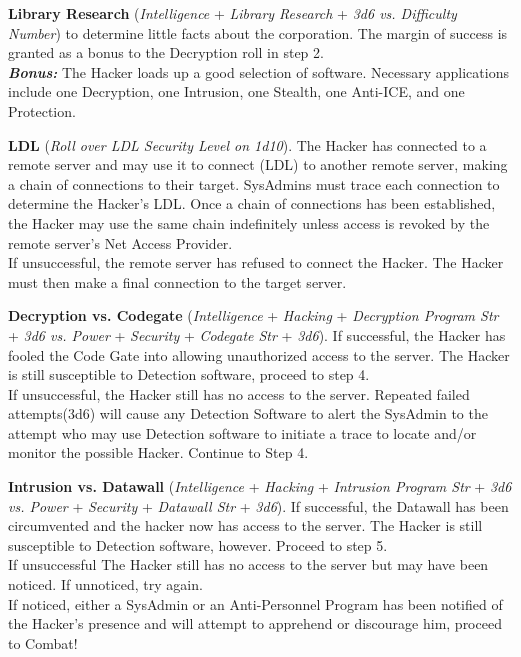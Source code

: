 \documentclass[11pt,twoside,a4paper]{article}
\newenvironment{local_enumerate}{
\begin{enumerate}
     \setlength{\itemsep}{1pt}
     \setlength{\parskip}{0pt}
     \setlength{\parsep}{0pt}}
{\end{enumerate}
}
\begin{document}
\begin{local_enumerate}
	\item \textbf{Library Research} (\emph{Intelligence} + \emph{Library Research} + \emph{3d6 vs. Difficulty Number}) to determine little facts about the corporation. The margin of success is granted as a bonus to the Decryption roll in step 2. ~\\
		\textbf{\emph{Bonus: }}The Hacker loads up a good selection of software. Necessary applications include one Decryption, one Intrusion, one Stealth, one Anti-ICE, and one Protection.
	\item \textbf{LDL} (\emph{Roll over LDL Security Level on 1d10}). The Hacker has connected to a remote server and may use it to connect (LDL) to another remote server, making a chain of connections to their target. SysAdmins must trace each connection to determine the Hacker's LDL. Once a chain of connections has been established, the Hacker may use the same chain indefinitely unless access is revoked by the remote server's Net Access Provider. ~\\
		If unsuccessful, the remote server has refused to connect the Hacker. The Hacker must then make a final connection to the target server.
	\item \textbf{Decryption vs. Codegate} (\emph{Intelligence} + \emph{Hacking} + \emph{Decryption Program Str} + \emph{3d6 vs. Power} + \emph{Security} + \emph{Codegate Str} + \emph{3d6}). If successful, the Hacker has fooled the Code Gate into allowing unauthorized access to the server. The Hacker is still susceptible to Detection software, proceed to step 4. ~\\
		If unsuccessful, the Hacker still has no access to the server. Repeated failed attempts(3d6) will cause any Detection Software to alert the SysAdmin to the attempt who may use Detection software to initiate a trace to locate and/or monitor the possible Hacker. Continue to Step 4.
	\item \textbf{Intrusion vs. Datawall} (\emph{Intelligence} + \emph{Hacking} + \emph{Intrusion Program Str} + \emph{3d6 vs. Power} + \emph{Security} + \emph{Datawall Str} + \emph{3d6}). If successful, the Datawall has been circumvented and the hacker now has access to the server. The Hacker is still susceptible to Detection software, however. Proceed to step 5. ~\\
		If unsuccessful The Hacker still has no access to the server but may have been noticed. If unnoticed, try again. ~\\
		If noticed, either a SysAdmin or an Anti-Personnel Program has been notified of the Hacker's presence and will attempt to apprehend or discourage him, proceed to Combat!

\end{local_enumerate}
\end{document}
